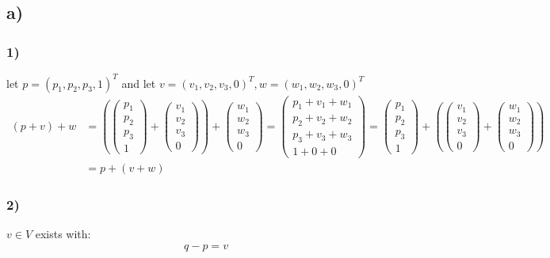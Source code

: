 \documentclass[a4paper]{scrartcl}
\begin{document}
\subsection*{a)}
\subsubsection*{1)}
let $p = (p_1, p_2, p_3, 1)^T$ and let $v = (v_1, v_2, v_3, 0)^T, w = (w_1, w_2, w_3, 0)^T$
\begin{align*}
  (p + v) + w &= \left( \begin{pmatrix} p_1 \\ p_2 \\ p_3 \\ 1 \end{pmatrix} + \begin{pmatrix} v_1 \\ v_2 \\ v_3 \\ 0 \end{pmatrix} \right) + \begin{pmatrix} w_1 \\ w_2 \\ w_3 \\ 0 \end{pmatrix}
  = \begin{pmatrix} p_1 + v_1 + w_1 \\ p_2 + v_2 + w_2 \\ p_3 + v_3 + w_3 \\ 1 + 0 + 0 \end{pmatrix}
  = \begin{pmatrix} p_1 \\ p_2 \\ p_3 \\ 1 \end{pmatrix} + \left( \begin{pmatrix} v_1 \\ v_2 \\ v_3 \\ 0 \end{pmatrix} + \begin{pmatrix} w_1 \\ w_2 \\ w_3 \\ 0 \end{pmatrix} \right) \\
  &= p + (v + w)
\end{align*}

\subsubsection*{2)}
$v \in V$ exists with:
\begin{align*}
  q - p = v
\end{align*}
\end{document}
